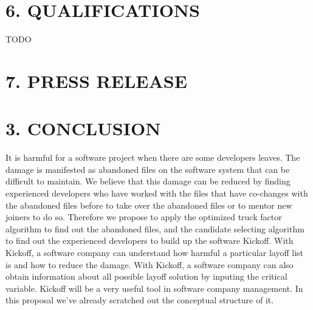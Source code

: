\documentclass[12pt, a4paper, openright]{report}
\begin{document}
\newpage
\section* {6. QUALIFICATIONS}
TODO
\newpage
\section* {7. PRESS RELEASE}


\newpage
\section*{3. CONCLUSION}
It is harmful for a software project when there are some developers leaves. The damage is manifested as abandoned
files on the software system that can be difficult to maintain.
We believe that this damage can be reduced by finding experienced developers who have worked with the files that have co-changes with the abandoned files before to take over the abandoned files or to mentor new joiners to do so. Therefore we propose to apply the optimized truck factor algorithm to find out the abandoned files, and the candidate selecting algorithm to find out the experienced developers to build up the software Kickoff. With Kickoff, a software company can understand how harmful a particular layoff list is and how to reduce the damage. With Kickoff, a software company can also obtain information about all possible layoff solution by inputing the critical variable. Kickoff will be a very useful tool in software company management. In this proposal we've already scratched out the conceptual structure of it.


\backmatter

%




\appendix
\newpage
\end{document}
